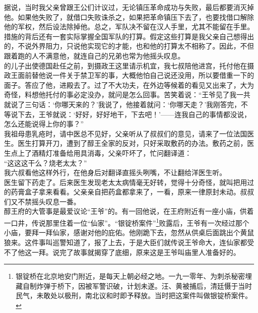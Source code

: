 据说，当时我父亲曾跟王公们计议过，无论镇压革命成功与失败，最后都要消灭掉他。如果他失败了，就借口失败诛杀之，如果把革命镇压下去了，也要找借口解除他的军权，然后设法除掉他。总之，军队决不留在汉人手里，尤其不能留在手里。措施的背后还有一套实际掌握全国军队的打算。假定这些打算是我父亲自己想得出的，不说外界阻力，只说他实现它的才能，也和他的打算太不相称了。因此，不但跟着跑的人不满意他，就连自己的兄弟也常为他摇头叹息。\\

的儿子出使德国赴任之前，到摄政王这里请示机宜，我七叔陪他进宫，托付他在摄政王面前替他说一件关于禁卫军的事，大概他怕自己说还没用，所以要借重一下的面子。答应了他，进殿去了。过了不大功夫，在外边等候着的看见又出来了，大为奇怪，料想他托付的事必定没办，就问是怎么回事。苦笑着说：“王爷见了我一共就说了三句话：‘你哪天来的？’我说了，他接着就问：‘你哪天走？’我刚答完，不等说下去，王爷就说：‘好好，好好地干，下去吧！’——连我自己的事情都没说，怎么还能说得上你的事？”\\

我祖母患乳疮时，请中医总不见好，父亲听从了叔叔们的意见，请来了一位法国医生。医生打算开刀，遭到了醇王全家的反对，只好采取敷药的办法。敷药之前，医生点上了酒精灯准备给用具消毒，父亲吓坏了，忙问翻译道：\\

“这这这干么？烧老太太？”\\

我六叔看他这样外行，在他身后对翻译直摇头咧嘴，不让翻给洋医生听。\\

医生留下药走了。后来医生发现老太太病情毫无好转，觉得十分奇怪，就叫把用过的药膏盒子拿来看看。父亲亲自把药盒都拿来了，一看，原来一律原封未动。叔叔们又不禁摇头叹息一番。\\

醇王府的大管事是最爱议论“王爷”的。有一回他说，在王府附近有一座小庙，供着一口井，传说那里住着一位“仙家”。“银锭桥案件”\footnote{银锭桥在北京地安门附近，是\color{NOTEXTColor}每天上朝必经之地。一九一零年、为刺杀秘密埋藏自制炸弹于桥下，因被军警识破，计划未遂。汪、黄被捕后，清廷慑于当时民气，未敢处以极刑，南北议和时即予释放。当时把这案件叫做银锭桥案件。}败露后，王爷有一次经过那个小庙，要拜一拜仙家，感谢对他的庇佑。他刚跪下去，忽然从供桌后面跳出个黄鼠狼来。这件事叫巡警知道了，报了上去，于是大臣们就传说王爷命大，连仙家都受不了他这一拜。说完了故事就揭穿了底细，原来这是王爷叫庙里人准备好的。\\

